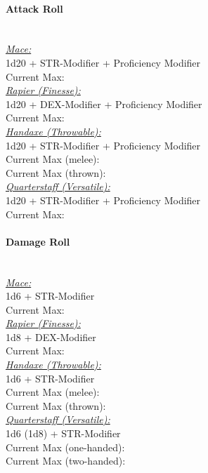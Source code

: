 \documentclass[letterpaper,openany,oneside,twocolumn]{book}
\begin{document}
\paragraph*{Attack Roll}\hfill\\
\underline{\textit{Mace:}}\\
1d20 + STR-Modifier + Proficiency Modifier\\
\indent Current Max: 
\\
\underline{\textit{Rapier (Finesse):}}\\
1d20 + DEX-Modifier + Proficiency Modifier\\
\indent Current Max: 
\\
\underline{\textit{Handaxe (Throwable):}}\\
1d20 + STR-Modifier + Proficiency Modifier\\
\indent Current Max (melee): \\
\indent Current Max (thrown): 
\\
\underline{\textit{Quarterstaff (Versatile):}}\\
1d20 + STR-Modifier + Proficiency Modifier\\
\indent Current Max: 
\paragraph*{Damage Roll}\hfill\\
\underline{\textit{Mace:}}\\
1d6 + STR-Modifier\\
\indent Current Max: 
\\
\underline{\textit{Rapier (Finesse):}}\\
1d8 + DEX-Modifier\\
\indent Current Max: 
\\
\underline{\textit{Handaxe (Throwable):}}\\
1d6 + STR-Modifier\\
\indent Current Max (melee): \\
\indent Current Max (thrown): 
\\
\underline{\textit{Quarterstaff (Versatile):}}\\
1d6 (1d8) + STR-Modifier\\
\indent Current Max (one-handed): \\
\indent Current Max (two-handed): 
\end{document}
